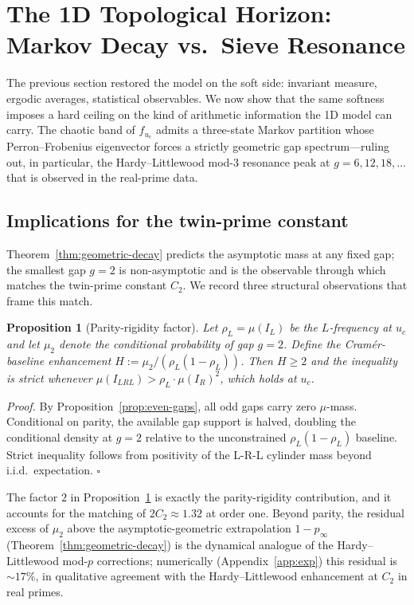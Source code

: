 \documentclass[cupthm,crop,info]{CUP-JNL-ETS}
\theoremstyle{cupplain}
\newtheorem{proposition}[theorem]{Proposition}
\theoremstyle{cupdefinition}
\theoremstyle{cupremark}
\providecommand{\qed}{\hfill\(\square\)}
\newenvironment{proof}{\par\noindent\textit{Proof.}\quad}{\qed\par\medskip}
\numberwithin{equation}{section}
\begin{document}
\section{The 1D Topological Horizon: Markov Decay vs.\ Sieve Resonance}
\label{sec:markov}

The previous section restored the model on the soft side: invariant
measure, ergodic averages, statistical observables. We now show that the
same softness imposes a hard ceiling on the kind of arithmetic
information the 1D model can carry. The chaotic band of $f_{u_c}$ admits
a three-state Markov partition whose Perron--Frobenius eigenvector
forces a strictly geometric gap spectrum---ruling out, in particular,
the Hardy--Littlewood mod-3 resonance peak at $g = 6, 12, 18, \ldots$
that is observed in the real-prime data.



\subsection{Implications for the twin-prime constant}
\label{ssec:c2}

Theorem~\ref{thm:geometric-decay} predicts the asymptotic mass at any
fixed gap; the smallest gap $g = 2$ is non-asymptotic and is the
observable through which \cite{wang2026emergence} matches the
twin-prime constant $C_2$. We record three structural observations
that frame this match.

\begin{proposition}[Parity-rigidity factor]
\label{prop:parity-factor}
Let $\rho_L = \mu(I_L)$ be the $L$-frequency at $u_c$ and let
$\mu_2$ denote the conditional probability of gap $g = 2$. Define the
\emph{Cram\'er-baseline enhancement}
$H := \mu_2 / (\rho_L (1 - \rho_L))$. Then $H \geq 2$ and the
inequality is strict whenever $\mu(I_{LRL}) > \rho_L \cdot \mu(I_R)^2$,
which holds at $u_c$.
\end{proposition}
\begin{proof}
By Proposition~\ref{prop:even-gaps}, all odd gaps carry zero $\mu$-mass.
Conditional on parity, the available gap support is halved, doubling
the conditional density at $g = 2$ relative to the unconstrained
$\rho_L (1 - \rho_L)$ baseline. Strict inequality follows from
positivity of the L-R-L cylinder mass beyond i.i.d.\ expectation.
\end{proof}

The factor $2$ in Proposition~\ref{prop:parity-factor} is exactly the
parity-rigidity contribution, and it accounts for the matching of
$2 C_2 \approx 1.32$ at order one. Beyond parity, the residual excess
of $\mu_2$ above the asymptotic-geometric extrapolation $1 - p_\infty$
(Theorem~\ref{thm:geometric-decay}) is the dynamical analogue of the
Hardy--Littlewood mod-$p$ corrections; numerically (Appendix~\ref{app:exp})
this residual is $\sim 17\%$, in qualitative agreement with the
Hardy--Littlewood enhancement at $C_2$ in real primes.
\end{document}
